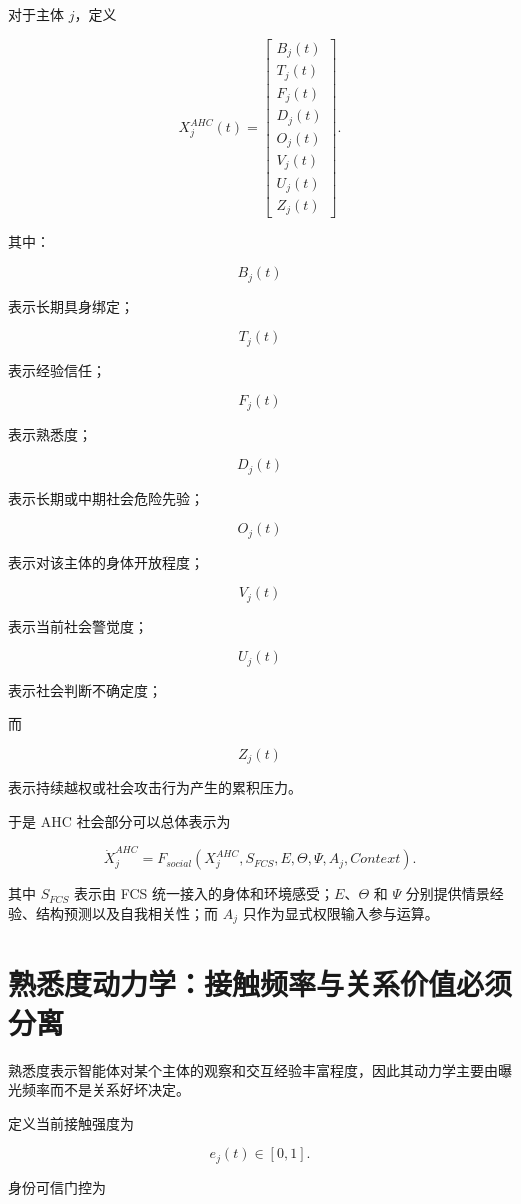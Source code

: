 对于主体 $j$，定义

\[
X_j^{AHC}(t)
=
\begin{bmatrix}
B_j(t)\\
T_j(t)\\
F_j(t)\\
D_j(t)\\
O_j(t)\\
V_j(t)\\
U_j(t)\\
Z_j(t)
\end{bmatrix}.
\]

其中：

\[
B_j(t)
\]

表示长期具身绑定；

\[
T_j(t)
\]

表示经验信任；

\[
F_j(t)
\]

表示熟悉度；

\[
D_j(t)
\]

表示长期或中期社会危险先验；

\[
O_j(t)
\]

表示对该主体的身体开放程度；

\[
V_j(t)
\]

表示当前社会警觉度；

\[
U_j(t)
\]

表示社会判断不确定度；

而

\[
Z_j(t)
\]

表示持续越权或社会攻击行为产生的累积压力。

于是 AHC 社会部分可以总体表示为

\[
\boxed{
\dot X_j^{AHC}
=
F_{social}
\left(
X_j^{AHC},
S_{FCS},
E,
\Theta,
\Psi,
A_j,
Context
\right).
}
\]

其中 $S_{FCS}$ 表示由 FCS 统一接入的身体和环境感受；$E$、$\Theta$ 和 $\Psi$ 分别提供情景经验、结构预测以及自我相关性；而 $A_j$ 只作为显式权限输入参与运算。


\section{熟悉度动力学：接触频率与关系价值必须分离}

熟悉度表示智能体对某个主体的观察和交互经验丰富程度，因此其动力学主要由曝光频率而不是关系好坏决定。

定义当前接触强度为

\[
e_j(t)\in[0,1].
\]

身份可信门控为

